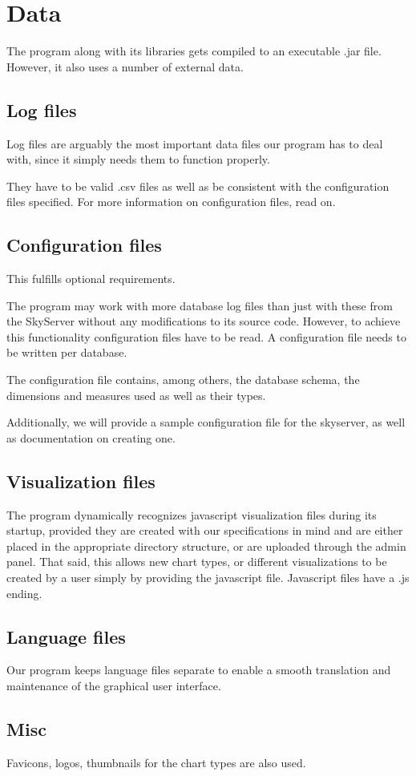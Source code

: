 \section{Data} %
The program along with its libraries gets compiled to an executable .jar file.
However, it also uses a number of external data.

\subsection{Log files}
Log files are arguably the most important data files our program has to deal with, since it simply
needs them to function properly.

They have to be valid .csv files as well as be consistent with the configuration files specified. 
For more information on configuration files, read on.

\subsection{Configuration files}
This fulfills optional requirements.

The program may work with more database log files than just with these from the SkyServer without 
any modifications to its source code.
However, to achieve this functionality configuration files have to be read. 
A configuration file needs to be written per database.

The configuration file contains, among others, the database schema, the dimensions and 
measures used as well as their types.

Additionally, we will provide a sample configuration file for the skyserver, 
as well as documentation on creating one.


\subsection{Visualization files}
The program dynamically recognizes javascript visualization files during its startup, provided
they are created with our specifications in mind and are either placed in the appropriate directory structure,
or are uploaded through the admin panel.
That said, this allows new chart types, or different visualizations to be created by a user simply by providing
the javascript file. Javascript files have a .js ending.

\subsection{Language files}
Our program keeps language files separate to enable a smooth translation and
maintenance of the graphical user interface.

\subsection{Misc}
Favicons, logos, thumbnails for the chart types are also used.
